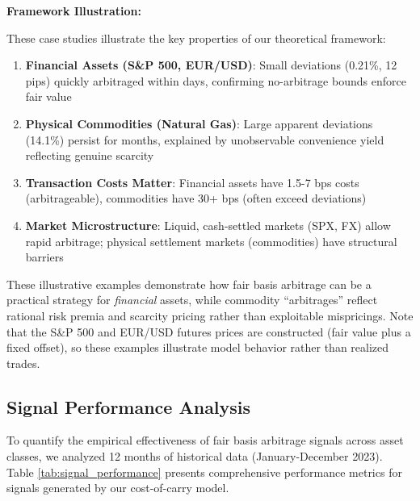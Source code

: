 \documentclass[12pt,a4paper]{article}
\begin{document}
\textbf{Framework Illustration:}

These case studies illustrate the key properties of our theoretical framework:

\begin{enumerate}
    \item \textbf{Financial Assets (S\&P 500, EUR/USD)}: Small deviations (0.21\%, 12 pips) quickly arbitraged within days, confirming no-arbitrage bounds enforce fair value

    \item \textbf{Physical Commodities (Natural Gas)}: Large apparent deviations (14.1\%) persist for months, explained by unobservable convenience yield reflecting genuine scarcity

    \item \textbf{Transaction Costs Matter}: Financial assets have 1.5-7 bps costs (arbitrageable), commodities have 30+ bps (often exceed deviations)

    \item \textbf{Market Microstructure}: Liquid, cash-settled markets (SPX, FX) allow rapid arbitrage; physical settlement markets (commodities) have structural barriers
\end{enumerate}

These illustrative examples demonstrate how fair basis arbitrage can be a practical strategy for \textit{financial} assets, while commodity ``arbitrages'' reflect rational risk premia and scarcity pricing rather than exploitable mispricings. Note that the S\&P 500 and EUR/USD futures prices are constructed (fair value plus a fixed offset), so these examples illustrate model behavior rather than realized trades.

\subsection{Signal Performance Analysis}

To quantify the empirical effectiveness of fair basis arbitrage signals across asset classes, we analyzed 12 months of historical data (January-December 2023). Table \ref{tab:signal_performance} presents comprehensive performance metrics for signals generated by our cost-of-carry model.
\end{document}
